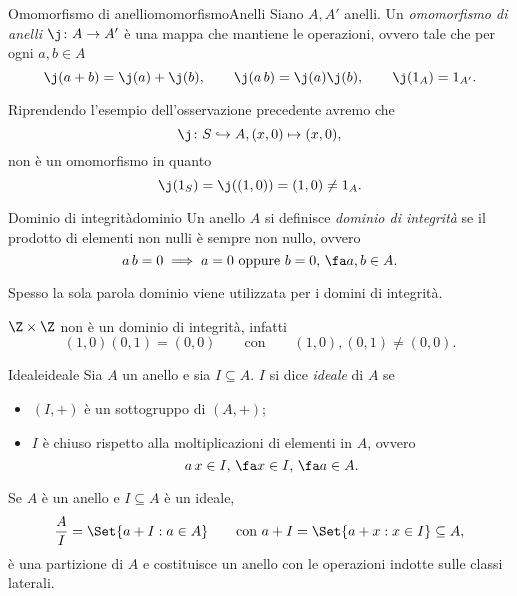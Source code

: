 \begin{defn}{Omomorfismo di anelli}{omomorfismoAnelli}
	Siano \(A,A'\) anelli.
	Un \emph{omomorfismo di anelli} \(\j\colon A \to A'\) è una mappa che mantiene le operazioni, ovvero tale che per ogni \(a,b\in A\)
	\[
		\j(a+b)=\j(a)+\j(b), \qquad \j(a\,b)=\j(a)\j(b), \qquad \j(1_A) = 1_{A'}.
	\]
\end{defn}

\begin{ese}
	Riprendendo l'esempio dell'osservazione precedente avremo che
	\[
		\j\colon S \hookrightarrow A, (x,0) \mapsto (x,0),
	\]
	non è un omomorfismo in quanto
	\[
		\j(1_S) = \j((1,0)) = (1,0) \neq 1_A.
	\]
\end{ese}

\begin{defn}{Dominio di integrità}{dominio}
	Un anello \(A\) si definisce \emph{dominio di integrità} se il prodotto di elementi non nulli è sempre non nullo, ovvero
	\[
		a\,b = 0 \implies a=0\text{ oppure }b=0,\,\fa a,b\in A.
	\]
\end{defn}

\begin{notz}
	Spesso la sola parola dominio viene utilizzata per i domini di integrità.
\end{notz}

\begin{ese}
	\(\Z \times \Z\) non è un dominio di integrità, infatti
	\[
		(1,0)(0,1) = (0,0) \qquad\text{con}\qquad (1,0),(0,1) \neq (0,0).
	\]
\end{ese}

\begin{defn}{Ideale}{ideale}
	Sia \(A\) un anello e sia \(I\subseteq A\).
	\(I\) si dice \emph{ideale} di \(A\) se
	\begin{itemize}
		\item \((I,+)\) è un sottogruppo di \((A,+)\);
		\item \(I\) è chiuso rispetto alla moltiplicazioni di elementi in \(A\), ovvero
		      \[
			      a\,x \in I,\,\fa x \in I,\,\fa a \in A.
		      \]
	\end{itemize}
\end{defn}

\begin{pr*}
	Se \(A\) è un anello e \(I\subseteq A\) è un ideale,
	\[
		\frac{A}{I} = \Set{a+I : a\in A} \qquad\text{con }a+I = \Set{a+x : x\in I}\subseteq A,
	\]
	è una partizione di \(A\) e costituisce un anello con le operazioni indotte sulle classi laterali.
\end{pr*}

